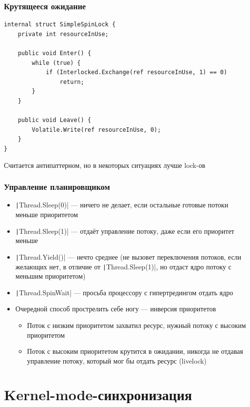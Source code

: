 \documentclass[xetex,mathserif,serif]{beamer}
\begin{document}
	\begin{frame}[fragile]
		\frametitle{Крутящееся ожидание}
		\begin{small}
			\begin{verbatim}
internal struct SimpleSpinLock {
    private int resourceInUse;

    public void Enter() {
        while (true) {
            if (Interlocked.Exchange(ref resourceInUse, 1) == 0) 
                return;
        }
    }

    public void Leave() {
        Volatile.Write(ref resourceInUse, 0);
    }
}
			\end{verbatim}
			Считается антипаттерном, но в некоторых ситуациях лучше lock-ов
		\end{small}
	\end{frame}

	\begin{frame}
		\frametitle{Управление планировщиком}
		\begin{small}
			\begin{itemize}
				\item \texttt|Thread.Sleep(0)| --- ничего не делает, если остальные готовые потоки меньше приоритетом
				\item \texttt|Thread.Sleep(1)| --- отдаёт управление потоку, даже если его приоритет меньше
				\item \texttt|Thread.Yield()| --- нечто среднее (не вызовет переключения потоков, если желающих нет, в отличие от \texttt|Thread.Sleep(1)|, но отдаст ядро потоку с меньшим приоритетом)
				\item \texttt|Thread.SpinWait| --- просьба процессору с гипертредингом отдать ядро
				\item Очередной способ прострелить себе ногу --- инверсия приоритетов
				\begin{itemize}
					\item Поток с низким приоритетом захватил ресурс, нужный потоку с высоким приоритетом
					\item Поток с высоким приоритетом крутится в ожидании, никогда не отдавая управление потоку, который мог бы отдать ресурс (livelock)
				\end{itemize}
			\end{itemize}
		\end{small}
	\end{frame}

	\section{Kernel-mode-синхронизация}
\end{document}
